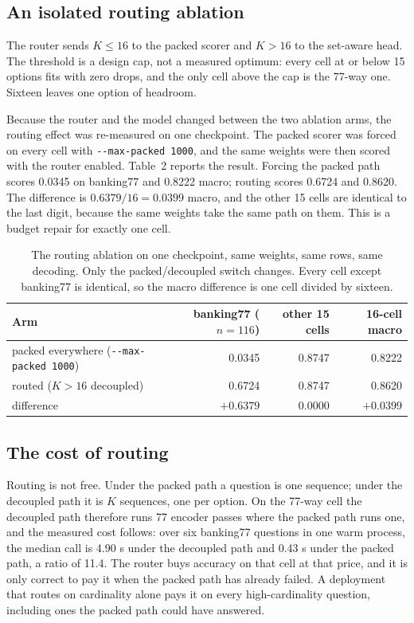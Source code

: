 \documentclass[11pt]{article}
\begin{document}
\subsection{An isolated routing ablation}
The router sends $K\le16$ to the packed scorer and $K>16$ to the set-aware head. The threshold is
a design cap, not a measured optimum: every cell at or below 15 options fits with zero drops, and
the only cell above the cap is the 77-way one. Sixteen leaves one option of headroom.

Because the router and the model changed between the two ablation arms, the routing
effect was re-measured on one checkpoint. The packed scorer was forced on every cell with
\texttt{-{}-max-packed 1000}, and the same weights were then scored with the router enabled.
Table~2 reports the result. Forcing the packed path scores 0.0345 on banking77
and 0.8222 macro; routing scores 0.6724 and 0.8620. The difference is $0.6379/16=0.0399$ macro,
and the other 15 cells are identical to the last digit, because the same weights take the same
path on them. This is a budget repair for exactly one cell.

\begin{table}
\centering
\footnotesize
\caption{The routing ablation on one checkpoint, same weights, same rows, same decoding. Only the
packed/decoupled switch changes. Every cell except banking77 is identical, so the macro difference
is one cell divided by sixteen.}\begin{tabular}{lrrr}
\toprule
Arm & banking77 ($n=116$) & other 15 cells & 16-cell macro \\
\midrule
packed everywhere (\texttt{-{}-max-packed 1000}) & 0.0345 & 0.8747 & 0.8222 \\
routed ($K>16$ decoupled) & 0.6724 & 0.8747 & 0.8620 \\
\midrule
difference & $+0.6379$ & $0.0000$ & $+0.0399$ \\
\bottomrule
\end{tabular}
\end{table}

\subsection{The cost of routing}
Routing is not free. Under the packed path a question is one sequence; under the decoupled path it
is $K$ sequences, one per option. On the 77-way cell the decoupled path therefore runs 77 encoder
passes where the packed path runs one, and the measured cost follows: over six banking77
questions in one warm process, the median call is 4.90 s under the decoupled path and 0.43 s
under the packed path, a ratio of 11.4. The router buys accuracy on that cell at that price, and it is only
correct to pay it when the packed path has already failed. A deployment that routes on
cardinality alone pays it on every high-cardinality question, including ones the packed path
could have answered.
\end{document}
